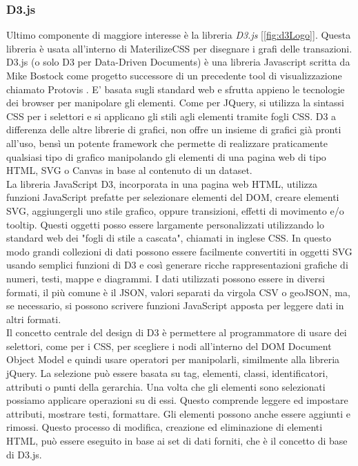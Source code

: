 \subsubsection{D3.js}
\label{sec:d3js}
Ultimo componente di maggiore interesse è la libreria \textit{D3.js} [\ref{fig:d3Logo}]. Questa libreria è usata all'interno di MaterilizeCSS per disegnare i grafi delle transazioni. D3.js (o solo D3 per Data-Driven Documents) è una libreria Javascript scritta da Mike Bostock come progetto successore di un precedente tool di visualizzazione chiamato Protovis \cite{d3:tutorialspoint}. E’ basata sugli standard web e sfrutta appieno le tecnologie dei browser per manipolare gli elementi. Come per JQuery, si utilizza la sintassi CSS per i selettori e si applicano gli stili agli elementi tramite fogli CSS. D3 a differenza delle altre librerie di grafici, non offre un insieme di grafici già pronti all'uso, bensì un potente framework che permette di realizzare praticamente qualsiasi tipo di grafico manipolando gli elementi di una pagina web di tipo HTML, SVG o Canvas in base al contenuto di un dataset.
\\La libreria JavaScript D3, incorporata in una pagina web HTML, utilizza funzioni JavaScript prefatte per selezionare elementi del DOM, creare elementi SVG, aggiungergli uno stile grafico, oppure transizioni, effetti di movimento e/o tooltip. Questi oggetti posso essere largamente personalizzati utilizzando lo standard web dei "fogli di stile a cascata", chiamati in inglese CSS. In questo modo grandi collezioni di dati possono essere facilmente convertiti in oggetti SVG usando semplici funzioni di D3 e così generare ricche rappresentazioni grafiche di numeri, testi, mappe e diagrammi. I dati utilizzati possono essere in diversi formati, il più comune è il JSON, valori separati da virgola CSV o geoJSON, ma, se necessario, si possono scrivere funzioni JavaScript apposta per leggere dati in altri formati. 
\\Il concetto centrale del design di D3 è permettere al programmatore di usare dei selettori, come per i CSS, per scegliere i nodi all'interno del DOM Document Object Model e quindi usare operatori per manipolarli, similmente alla libreria jQuery. La selezione può essere basata su tag, elementi, classi, identificatori, attributi o punti della gerarchia. Una volta che gli elementi sono selezionati possiamo applicare operazioni su di essi. Questo comprende leggere ed impostare attributi, mostrare testi, formattare. Gli elementi possono anche essere aggiunti e rimossi. Questo processo di modifica, creazione ed eliminazione di elementi HTML, può essere eseguito in base ai set di dati forniti, che è il concetto di base di D3.js.
